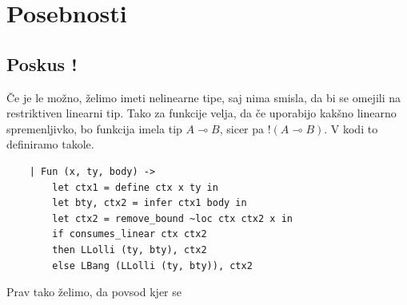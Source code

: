 \section{Posebnosti}

\subsection{Poskus !}

Če je le možno, želimo imeti nelinearne tipe, saj nima smisla, da bi se omejili na restriktiven linearni tip. Tako za funkcije velja, da če uporabijo kakšno linearno spremenljivko, bo funkcija imela tip \(A \multimap B\), sicer pa \(!(A \multimap B)\). V kodi to definiramo takole.
\begin{verbatim}
    | Fun (x, ty, body) ->
        let ctx1 = define ctx x ty in
        let bty, ctx2 = infer ctx1 body in
        let ctx2 = remove_bound ~loc ctx ctx2 x in
        if consumes_linear ctx ctx2
        then LLolli (ty, bty), ctx2
        else LBang (LLolli (ty, bty)), ctx2
\end{verbatim}

\begin{prooftree}
\end{prooftree}

Prav tako želimo, da povsod kjer se 